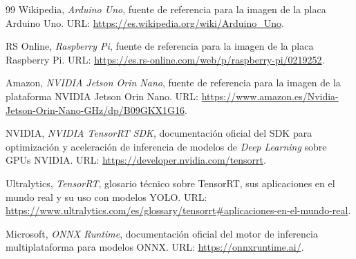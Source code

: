 \begin{thebibliography}{99}
 Wikipedia, \textit{Arduino Uno}, fuente de referencia para la imagen de la placa Arduino Uno. URL: \url{https://es.wikipedia.org/wiki/Arduino_Uno}.

 RS Online, \textit{Raspberry Pi}, fuente de referencia para la imagen de la placa Raspberry Pi. URL: \url{https://es.rs-online.com/web/p/raspberry-pi/0219252}.

 Amazon, \textit{NVIDIA Jetson Orin Nano}, fuente de referencia para la imagen de la plataforma NVIDIA Jetson Orin Nano. URL: \url{https://www.amazon.es/Nvidia-Jetson-Orin-Nano-GHz/dp/B09GKX1G16}.

 NVIDIA, \textit{NVIDIA TensorRT SDK}, documentación oficial del SDK para optimización y aceleración de inferencia de modelos de \textit{Deep Learning} sobre GPUs NVIDIA. URL: \url{https://developer.nvidia.com/tensorrt}.

 Ultralytics, \textit{TensorRT}, glosario técnico sobre TensorRT, sus aplicaciones en el mundo real y su uso con modelos YOLO. URL: \url{https://www.ultralytics.com/es/glossary/tensorrt\#aplicaciones-en-el-mundo-real}.

 Microsoft, \textit{ONNX Runtime}, documentación oficial del motor de inferencia multiplataforma para modelos ONNX. URL: \url{https://onnxruntime.ai/}.

\end{thebibliography}
\endgroup